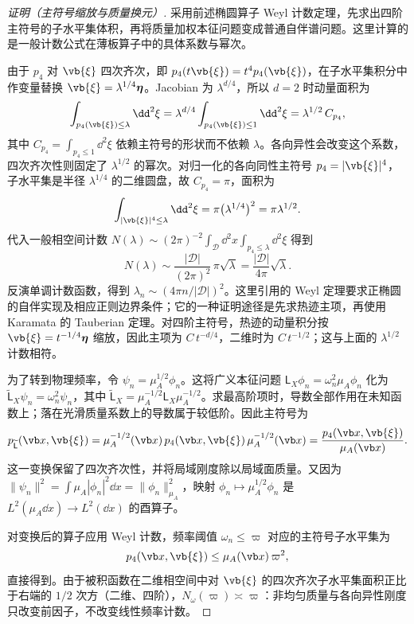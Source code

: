 \begin{proof}[证明（主符号缩放与质量换元）]
采用前述椭圆算子 Weyl 计数定理，先求出四阶主符号的子水平集体积，再将质量加权本征问题变成普通自伴谱问题。这里计算的是一般计数公式在薄板算子中的具体系数与幂次。

由于 \(p_4\) 对 \(\vb{\xi}\) 四次齐次，即 \(p_4(t\vb{\xi})=t^4p_4(\vb{\xi})\)，在子水平集积分中作变量替换 \(\vb{\xi}=\lambda^{1/4}\boldsymbol\eta\)。Jacobian 为 $\lambda^{d/4}$，所以 $d=2$ 时动量面积为
\begin{equation*}
 \int_{p_4(\vb{\xi})\le\lambda}\dd^2\xi
 =\lambda^{d/4}\int_{p_4(\vb{\xi})\le1}\dd^2\xi
 =\lambda^{1/2}\,C_{p_4},
\end{equation*}
其中 \(C_{p_4}=\int_{p_4\le1}\dd^2\xi\) 依赖主符号的形状而不依赖 \(\lambda\)。各向异性会改变这个系数，四次齐次性则固定了 $\lambda^{1/2}$ 的幂次。对归一化的各向同性主符号 \(p_4=|\vb{\xi}|^4\)，子水平集是半径 \(\lambda^{1/4}\) 的二维圆盘，故 \(C_{p_4}=\pi\)，面积为
\begin{equation*}
 \int_{|\vb{\xi}|^4\le\lambda}\dd^2\xi
 =\pi\bigl(\lambda^{1/4}\bigr)^2
 =\pi\lambda^{1/2}.
\end{equation*}
代入一般相空间计数 \(N(\lambda)\sim(2\pi)^{-2}\int_\mathcal D\dd^2x\int_{p_4\le\lambda}\dd^2\xi\) 得到
\begin{equation*}
 N(\lambda)
 \sim\frac{|\mathcal D|}{(2\pi)^2}\,\pi\sqrt\lambda
 =\frac{|\mathcal D|}{4\pi}\sqrt\lambda.
\end{equation*}
反演单调计数函数，得到 \(\lambda_n\sim(4\pi n/|\mathcal D|)^2\)。这里引用的 Weyl 定理要求正椭圆的自伴实现及相应正则边界条件；它的一种证明途径是先求热迹主项，再使用 Karamata 的 Tauberian 定理。对四阶主符号，热迹的动量积分按 $\vb{\xi}=t^{-1/4}\boldsymbol\eta$ 缩放，因此主项为 $C\,t^{-d/4}$，二维时为 $C\,t^{-1/2}$；这与上面的 $\lambda^{1/2}$ 计数相符。

为了转到物理频率，令 \(\psi_n=\mu_A^{1/2}\phi_n\)。这将广义本征问题 \(\mathsf L_X\phi_n=\omega_n^2\mu_A\phi_n\) 化为 \(\widetilde{\mathsf L}_X\psi_n=\omega_n^2\psi_n\)，其中 \(\widetilde{\mathsf L}_X=\mu_A^{-1/2}\mathsf L_X\mu_A^{-1/2}\)。求最高阶项时，导数全部作用在未知函数上；落在光滑质量系数上的导数属于较低阶。因此主符号为
\begin{equation*}
 p_{\widetilde{\mathsf L}}(\vb x,\vb{\xi})
 =\mu_A^{-1/2}(\vb x)\,p_4(\vb x,\vb{\xi})\,\mu_A^{-1/2}(\vb x)
 =\frac{p_4(\vb x,\vb{\xi})}{\mu_A(\vb x)}.
\end{equation*}
这一变换保留了四次齐次性，并将局域刚度除以局域面质量。又因为 \(\|\psi_n\|^2=\int\mu_A|\phi_n|^2\dd x=\|\phi_n\|_{\mu_A}^2\)，映射 \(\phi_n\mapsto\mu_A^{1/2}\phi_n\) 是 \(L^2(\mu_A\dd x)\to L^2(\dd x)\) 的酉算子。

对变换后的算子应用 Weyl 计数，频率阈值 \(\omega_n\le\varpi\) 对应的主符号子水平集为
\begin{equation*}
 p_4(\vb x,\vb{\xi})
 \le\mu_A(\vb x)\,\varpi^2,
\end{equation*}
直接得到。由于被积函数在二维相空间中对 \(\vb{\xi}\) 的四次齐次子水平集面积正比于右端的 \(1/2\) 次方（二维、四阶），\(N_\omega(\varpi)\asymp\varpi\)：非均匀质量与各向异性刚度只改变前因子，不改变线性频率计数。

\end{proof}

